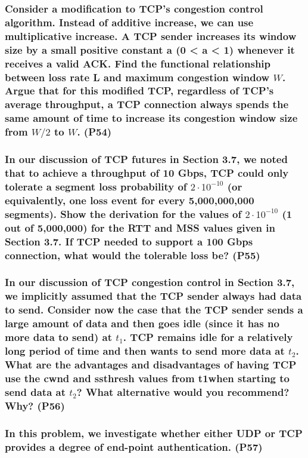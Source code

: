 \subsubsection{Consider a modification to TCP's congestion control algorithm. Instead of additive increase, we can use multiplicative increase. A TCP sender increases its window size by a small positive constant a (0 < a < 1) whenever it receives a valid ACK. Find the functional relationship between loss rate L and maximum congestion window $W$. Argue that for this modified TCP, regardless of TCP's average throughput, a TCP connection always spends the same amount of time to increase its congestion window size from $W/2$ to $W$. (P54)}


\subsubsection{In our discussion of TCP futures in Section 3.7, we noted that to achieve a throughput of 10 Gbps, TCP could only tolerate a segment loss probability of $2 \cdot 10^{-10}$ (or equivalently, one loss event for every 5,000,000,000 segments). Show the derivation for the values of $2 \cdot 10^{-10}$ (1 out of 5,000,000) for the RTT and MSS values given in Section 3.7. If TCP needed to support a  100 Gbps connection, what would the tolerable loss be? (P55)}


\subsubsection{In our discussion of TCP congestion control in Section 3.7, we implicitly assumed that the TCP sender always had data to send. Consider now the case that the TCP sender sends a large amount of data and then goes idle (since it has no more data to send) at $t_1$. TCP remains idle for a relatively long period of time and then wants to send more data at $t_2$. What are the advantages and disadvantages of having TCP use the cwnd and ssthresh values from t1when starting to send data at $t_2$? What alternative would you recommend? Why? (P56)}


\subsubsection{In this problem, we investigate whether either UDP or TCP provides a degree of end-point authentication. (P57)}

